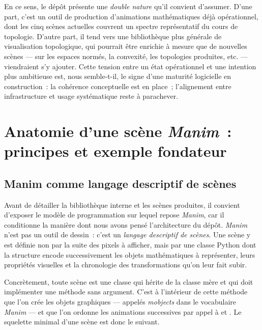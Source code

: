 \documentclass[12pt, a4paper, openany]{report}
\begin{document}
	En ce sens, le dépôt présente une \emph{double nature} qu’il convient d’assumer. D’une part, c’est un outil de production d’animations mathématiques déjà opérationnel, dont les cinq scènes actuelles couvrent un spectre représentatif du cours de topologie. D’autre part, il tend vers une bibliothèque plus générale de visualisation topologique, qui pourrait être enrichie à mesure que de nouvelles scènes — sur les espaces normés, la convexité, les topologies produites, etc. — viendraient s’y ajouter. Cette tension entre un état opérationnel et une intention plus ambitieuse est, nous semble-t-il, le signe d’une maturité logicielle en construction~: la cohérence conceptuelle est en place~; l’alignement entre infrastructure et usage systématique reste à parachever.
	
	\chapter[Anatomie d’une scène \textit{Manim}]{Anatomie d’une scène \textit{Manim}~:\\ principes et exemple fondateur}\label{chap:manim}

	\section{Manim comme langage descriptif de scènes}

	Avant de détailler la bibliothèque interne et les scènes produites, il convient d’exposer le modèle de programmation sur lequel repose \textit{Manim}, car il conditionne la manière dont nous avons pensé l’architecture du dépôt. \textit{Manim} n’est pas un outil de dessin~: c’est un \emph{langage descriptif de scènes}. Une scène y est définie non par la suite des pixels à afficher, mais par une classe Python dont la structure encode successivement les objets mathématiques à représenter, leurs propriétés visuelles et la chronologie des transformations qu’on leur fait subir.

	Concrètement, toute scène est une classe qui hérite de la classe mère  et qui doit implémenter une méthode  sans argument. C’est à l’intérieur de cette méthode que l’on crée les objets graphiques — appelés \emph{mobjects} dans le vocabulaire \textit{Manim} — et que l’on ordonne les animations successives par appel à  et . Le squelette minimal d’une scène est donc le suivant.
\end{document}
